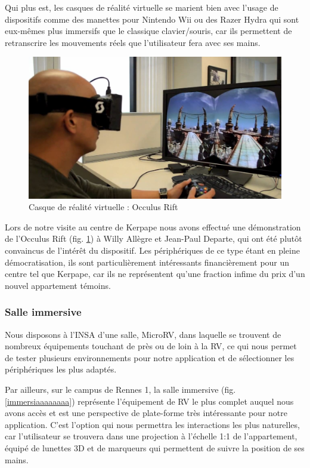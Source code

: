 Qui plus est, les casques de réalité virtuelle se marient bien avec l'usage de dispositifs comme des manettes pour Nintendo Wii ou des Razer Hydra qui sont eux-mêmes plus immersifs que le classique clavier/souris, car ils permettent de retranscrire les mouvements réels que l'utilisateur fera avec ses mains.
\begin{figure}
  \centering
  \includegraphics[scale=0.3]{2-Specifications/img-utilisateur/occulus.jpg}
	\caption{Casque de réalité virtuelle : Occulus Rift}
	\label{occulus_reparo}
\end{figure}
Lors de notre visite au centre de Kerpape nous avons effectué une démonstration de l'Occulus Rift (fig. \ref{occulus_reparo}) à Willy Allègre et Jean-Paul Departe, qui ont été plutôt convaincus de l'intérêt du dispositif. 
Les périphériques de ce type étant en pleine démocratisation, ils sont particulièrement intéressants financièrement pour un centre tel que Kerpape, car ils ne représentent qu'une fraction infime du prix d'un nouvel appartement témoins.

\subsubsection{Salle immersive}
Nous disposons à l'INSA d'une salle, MicroRV, dans laquelle se trouvent de nombreux équipements touchant de près ou de loin à la RV, ce qui nous permet de tester plusieurs environnements pour notre application et de sélectionner les périphériques les plus adaptés.

Par ailleurs, sur le campus de Rennes 1, la salle immersive (fig. \ref{immersiaaaaaaaa}) représente l'équipement de RV le plus complet auquel nous avons accès et est une perspective de plate-forme très intéressante pour notre application. C'est l'option qui nous permettra les interactions les plus naturelles, car l'utilisateur se trouvera dans une projection à l'échelle 1:1 de l'appartement, équipé de lunettes 3D et de marqueurs qui permettent de suivre la position de ses mains.

